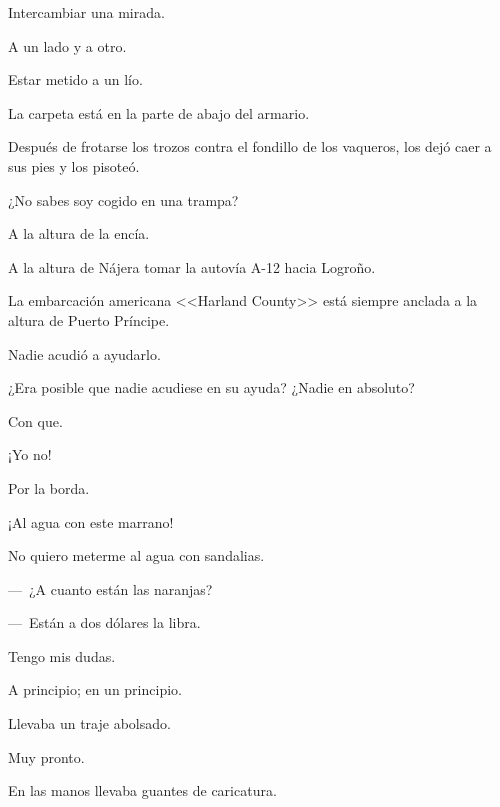 \sk
Intercambiar una mirada. 

\sk
A un lado y a otro. 

\sk
Estar metido a un lío. 

\sk
La carpeta está en la parte de abajo del armario. \nb{}

\sk
Después de frotarse los trozos contra el fondillo de los vaqueros, los dejó caer a sus pies y los pisoteó. 

\sk
¿No sabes soy cogido en una trampa? 

\sk
A la altura de la encía. 

\sk
A la altura de Nájera tomar la autovía A-12 hacia Logroño. 

\sk
La embarcación americana <<Harland County>> está siempre anclada a la altura de Puerto Príncipe. 

\sk
Nadie acudió a ayudarlo. 

\sk
¿Era posible que nadie acudiese en su ayuda? ¿Nadie en absoluto? 

\sk
Con que. 

\sk
¡Yo no! 

\sk
Por la borda. 

\sk
¡Al agua con este marrano! 

\sk
No quiero meterme al agua con sandalias. 

\sk
---~¿A cuanto están las naranjas? 

---~Están a dos dólares la libra. 

\sk
Tengo mis dudas. 

\sk
A principio; en un principio. 

\sk
Llevaba un traje abolsado. \nb{}

\sk
Muy pronto. 

\sk
En las manos llevaba guantes de caricatura. 

